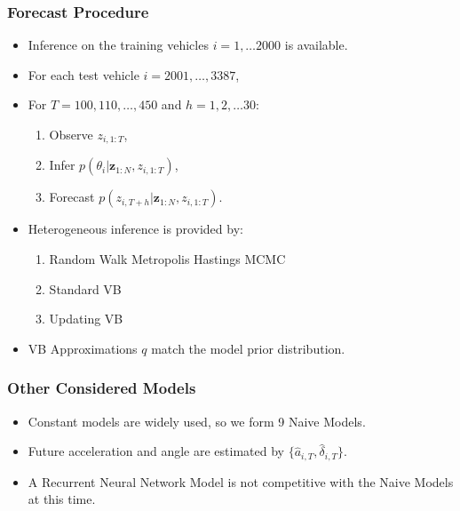 \documentclass[11pt]{beamer}\usepackage[]{graphicx}\usepackage[]{color}
\begin{document}
\begin{frame}
\frametitle{Forecast Procedure}
\begin{itemize}
\item Inference on the training vehicles $i = 1, \dots 2000$ is available.
\item For each test vehicle $i = 2001, \dots, 3387$, 
\item For $T = 100, 110, \dots, 450$ and $h = 1, 2, \dots 30$:
\begin{enumerate}
\item Observe $z_{i, 1:T}$,
\item Infer $p(\theta_{i} | \textbf{z}_{1:N}, z_{i, 1:T})$,
\item Forecast $p(z_{i, T+h} | \textbf{z}_{1:N},  z_{i, 1:T})$.
\end{enumerate}
\vspace{2mm}
\pause
\item Heterogeneous inference is provided by:
\begin{enumerate}
\item Random Walk Metropolis Hastings MCMC
\item Standard VB 
\item Updating VB
\end{enumerate}
\item VB Approximations $q$ match the model prior distribution.
\end{itemize}
\end{frame}

\begin{frame}
\frametitle{Other Considered Models}
\begin{itemize}
\item Constant models are widely used, so we form 9 Naive Models.
\item Future acceleration and angle are estimated by $\{\hat{a}_{i, T}, \hat{\delta}_{i, T}\}$.
\begin{table}
\begin{center}
\end{center}
\label{tableNaive}
\end{table}
\item A Recurrent Neural Network Model is not competitive with the Naive Models at this time.
\end{itemize}
\end{frame}
\end{document}

